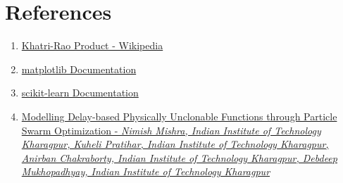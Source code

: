 \documentclass{article}
\begin{document}
\section[short]{References}
  \begin{enumerate}
    \item \href{https://en.wikipedia.org/wiki/Khatri%E2%80%93Rao_product#Column-wise_Kronecker_product}{Khatri-Rao Product - Wikipedia}
    \item \href{https://matplotlib.org/stable/gallery/index.html}{matplotlib Documentation}
    \item \href{https://scikit-learn.org/stable/modules/generated/sklearn.svm.LinearSVC.html}{scikit-learn Documentation}
    \item \href{https://eprint.iacr.org/2023/287}{Modelling Delay-based Physically Unclonable Functions through Particle Swarm Optimization - \normalsize \textit{
    Nimish Mishra, Indian Institute of Technology Kharagpur,
    Kuheli Pratihar, Indian Institute of Technology Kharagpur,
    Anirban Chakraborty, Indian Institute of Technology Kharagpur,
    Debdeep Mukhopadhyay, Indian Institute of Technology Kharagpur}}
  \end{enumerate}
\end{document}
